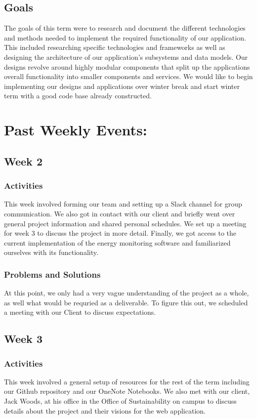 \documentclass[journal,10pt,onecolumn,compsoc]{IEEEtran} \usepackage[margin=1.0in]{geometry} \usepackage{pdfpages}
\begin{document}
    \subsection{Goals}
    The goals of this term were to research and document the different technologies and methods needed to implement the required functionality of our application. This included researching specific technologies and frameworks as well as designing the architecture of our application's subsystems and data models. Our designs revolve around highly modular components that split up the applications overall functionality into smaller components and services. We would like to begin implementing our designs and applications over winter break and start winter term with a good code base already constructed.
    
    \section{Past Weekly Events:}
    \subsection{Week 2}
    \subsubsection{Activities} 
    This week involved forming our team and setting up a Slack channel for group communication. We also got in contact with our client and briefly went over general project information and shared personal schedules. We set up a meeting for week 3 to discuss the project in more detail. Finally, we got access to the current implementation of the energy monitoring software and familiarized ourselves with its functionality.
    \subsubsection{Problems and Solutions} 
	At this point, we only had a very vague understanding of the project as a whole, as well what would be requried as a deliverable. To figure this out, we scheduled a meeting with our Client to discuss expectations.
    \subsection{Week 3}
    \subsubsection{Activities} 
    This week involved a general setup of resources for the rest of the term including our Github repository and our OneNote Notebooks. We also met with our client, Jack Woods, at his office in the Office of Sustainability on campus to discuss details about the project and their visions for the web application.
\end{document}
